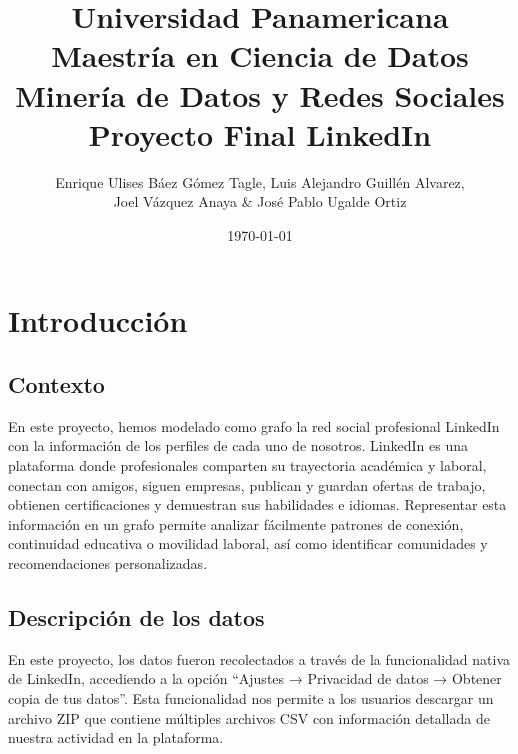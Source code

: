 \documentclass[10pt]{article}
\title{Universidad Panamericana \\ Maestría en Ciencia de Datos \\ Minería de Datos y Redes Sociales \\ \vspace{0.5cm} Proyecto Final LinkedIn}
\author{Enrique Ulises Báez Gómez Tagle, Luis Alejandro Guillén Alvarez, \\Joel Vázquez Anaya \& José Pablo Ugalde Ortiz}
\date{\today}
\begin{document}
\maketitle

\tableofcontents
\newpage

\section{Introducción}
\subsection{Contexto}

En este proyecto, hemos modelado como grafo la red social profesional LinkedIn con la información de los perfiles de cada uno de nosotros. LinkedIn es una plataforma donde profesionales comparten su trayectoria académica y laboral, conectan con amigos, siguen empresas, publican y guardan ofertas de trabajo, obtienen certificaciones y demuestran sus habilidades e idiomas. Representar esta información en un grafo permite analizar fácilmente patrones de conexión, continuidad educativa o movilidad laboral, así como identificar comunidades y recomendaciones personalizadas.
\subsection{Descripción de los datos}

En este proyecto, los datos fueron recolectados a través de la funcionalidad nativa de LinkedIn, accediendo a la opción “Ajustes → Privacidad de datos → Obtener copia de tus datos”. Esta funcionalidad nos permite a los usuarios descargar un archivo ZIP que contiene múltiples archivos CSV con información detallada de nuestra actividad en la plataforma.
\end{document}
